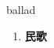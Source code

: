 
\begin{frame}
{\huge ballad}
\begin{center}
\begin{enumerate}\Large
  \item \textbf{民歌}
\end{enumerate}
\end{center}
\end{frame}
